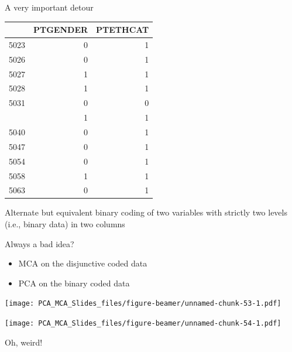 \documentclass[
  ignorenonframetext,
]{beamer}
\providecommand{\tightlist}{%
  \setlength{\itemsep}{0pt}\setlength{\parskip}{0pt}}
\begin{document}
\begin{frame}{A very important detour}
\protect\hypertarget{a-very-important-detour-4}{}

\begin{table}[H]
\centering\begingroup\fontsize{7}{9}\selectfont

\begin{tabular}{lrr}
\toprule
  & PTGENDER & PTETHCAT\\
\midrule
5023 & 0 & 1\\
5026 & 0 & 1\\
5027 & 1 & 1\\
5028 & 1 & 1\\
5031 & 0 & 0\\
\addlinespace
5037 & 1 & 1\\
5040 & 0 & 1\\
5047 & 0 & 1\\
5054 & 0 & 1\\
5058 & 1 & 1\\
5063 & 0 & 1\\
\bottomrule
\end{tabular}\endgroup{}
\end{table}

\begin{center}Alternate but equivalent binary coding of two variables with strictly two levels (i.e., binary data) in two columns\end{center}

\end{frame}

\begin{frame}{Always a bad idea?}
\protect\hypertarget{always-a-bad-idea}{}

\begin{itemize}[<+->]
\tightlist
\item
  MCA on the disjunctive coded data
\item
  PCA on the binary coded data
\end{itemize}

\end{frame}

\begin{frame}

\texttt{[image: PCA\_MCA\_Slides\_files/figure-beamer/unnamed-chunk-53-1.pdf]}

\end{frame}

\begin{frame}

\texttt{[image: PCA\_MCA\_Slides\_files/figure-beamer/unnamed-chunk-54-1.pdf]}

\begin{center}Oh, weird!\end{center}

\end{frame}
\end{document}
